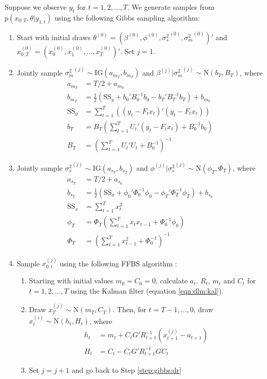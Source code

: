 Suppose we observe $y_t$ for $t = 1,2,\ldots,T$. We generate samples from $p(x_{0:T},\theta|y_{1:t})$ using the following Gibbs sampling algorithm:
\begin{enumerate}
\item Start with initial draws $\theta^{(0)} = (\beta^{(0)}, \phi^{(0)}, {\sigma^2_s}^{(0)}, {\sigma^2_m}^{(0)})'$ and \\ $x^{(0)}_{0:T} = (x^{(0)}_0, x^{(0)}_1, \ldots, x^{(0)}_T)'$. Set $j = 1$.
\item \label{step:gibbs:dr} Jointly sample ${\sigma^2_m}^{(j)} \sim \mbox{IG}(a_{m_T}, b_{m_T})$ and $\beta^{(j)}|{\sigma^2_m}^{(j)} \sim \mbox{N}(b_T,B_T)$, where
\begin{align}
a_{m_T} &= T/2 + a_{m_0} \label{eqn:dr:am} \\
b_{m_T} &= \frac{1}{2}(\mbox{SS}_y + b_0'B_0^{-1}b_0 - b_T'B_T^{-1}b_T) + b_{m_0} \label{eqn:dr:bm} \\
\mbox{SS}_y &= \sum^T_{t=1} \left((y_t - F_tx_t)'(y_t - F_tx_t)\right) \label{eqn:dr:ssy} \\
b_T &= B_T\left( \sum^T_{t=1} U_t'(y_t - F_tx_t) + B_0^{-1}b_0\right) \label{eqn:dr:b} \\
B_T &= \left(\sum^T_{t=1} U_t'U_t + B_0^{-1}\right)^{-1} \label{eqn:dr:B}
\end{align}
\item Jointly sample ${\sigma^2_s}^{(j)} \sim \mbox{IG}(a_{s_T}, b_{s_T})$ and $\phi^{(j)}|{\sigma^2_s}^{(j)} \sim \mbox{N}(\phi_T,\Phi_T)$, where
\begin{align}
a_{s_T} &= T/2 + a_{s_0} \label{eqn:dr:as} \\
b_{s_T} &= \frac{1}{2}(\mbox{SS}_x + \phi_0'\Phi_0^{-1}\phi_0 - \phi_T'\Phi_T^{-1}\phi_T) + b_{s_0} \label{eqn:dr:bs} \\
\mbox{SS}_x &= \sum^T_{t=1} x_t^2 \label{eqn:dr:ssx} \\
\phi_T &= \Phi_T\left( \sum^T_{t=1} x_tx_{t-1} + \Phi_0^{-1}\phi_0\right) \label{eqn:dr:phi} \\
\Phi_T &= \left(\sum^T_{t=1} x_{t-1}^2 + \Phi_0^{-1}\right)^{-1} \label{eqn:dr:Phi}
\end{align}
\item \label{step:ffbs} Sample $x_{0:t}^{(j)}$ using the following FFBS algorithm \cite[Sec 4.4][]{petris:camp:2009:dynamic}:
\begin{enumerate}
\item Starting with initial values $m_0 = C_0 = 0$, calculate $a_t$, $R_t$, $m_t$ and $C_t$ for $t = 1,2,\ldots,T$ using the Kalman filter (equation \eqref{eqn:dlm:kal}).
\item Draw $x_T^{(j)} \sim \mbox{N}(m_T,C_T)$. Then, for $t = T-1,\ldots,0$, draw $x_t^{(i)} \sim \mbox{N}(h_t,H_t)$, where
    \begin{align*}
    h_t &= m_t + C_tG'R_{t+1}^{-1}(x_{t+1}^{(j)} - a_{t+1}) \\
    H_t &= C_t - C_tG'R_{t+1}^{-1}GC_t
    \end{align*}
\item Set $j = j + 1$ and go back to Step \ref{step:gibbs:dr}
\end{enumerate}
\end{enumerate}

